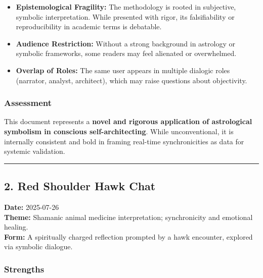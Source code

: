 \documentclass{article}
\begin{document}
\begin{itemize}
\item
  \textbf{Epistemological Fragility:} The methodology is rooted in
  subjective, symbolic interpretation. While presented with rigor, its
  falsifiability or reproducibility in academic terms is debatable.
\item
  \textbf{Audience Restriction:} Without a strong background in
  astrology or symbolic frameworks, some readers may feel alienated or
  overwhelmed.
\item
  \textbf{Overlap of Roles:} The same user appears in multiple dialogic
  roles (narrator, analyst, architect), which may raise questions about
  objectivity.
\end{itemize}

\subsubsection*{\texorpdfstring{\textbf{Assessment}}{Assessment}}\label{assessment}

This document represents a \textbf{novel and rigorous application of
astrological symbolism in conscious self-architecting}. While
unconventional, it is internally consistent and bold in framing
real-time synchronicities as data for systemic validation.

\begin{center}\rule{0.5\linewidth}{0.5pt}\end{center}

\subsection*{}\label{section-5}

\subsection*{\texorpdfstring{\textbf{ 2. Red Shoulder Hawk
Chat}}{ 2. Red Shoulder Hawk Chat}}\label{red-shoulder-hawk-chat}

\textbf{Date:} 2025-07-26\\
\textbf{Theme:} Shamanic animal medicine interpretation; synchronicity
and emotional healing.\\
\textbf{Form:} A spiritually charged reflection prompted by a hawk
encounter, explored via symbolic dialogue.

\subsubsection*{\texorpdfstring{\textbf{Strengths}}{Strengths}}\label{strengths-1}
\end{document}
